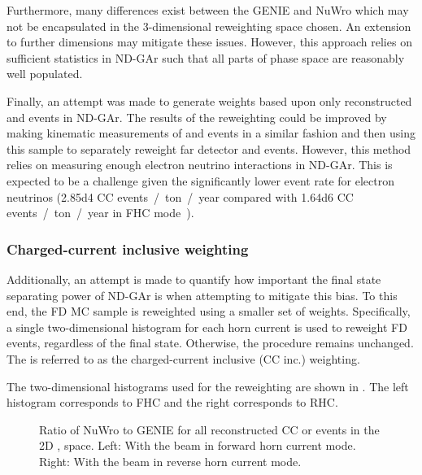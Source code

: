 Furthermore, many differences exist between the GENIE and NuWro which may not be encapsulated in the 3-dimensional reweighting space chosen.
An extension to further dimensions may mitigate these issues.
However, this approach relies on sufficient statistics in ND-GAr such that all parts of phase space are reasonably well populated.

Finally, an attempt was made to generate weights based upon only reconstructed \numu and \anumu events in ND-GAr.
The results of the reweighting could be improved by making kinematic measurements of \nue and \anue events in a similar fashion and then using this sample to separately reweight far detector \nue and \anue events.
However, this method relies on measuring enough electron neutrino interactions in ND-GAr.
This is expected to be a challenge given the significantly lower event rate for electron neutrinos (\num{2.85d4} CC events~/~ton~/~year compared with \num{1.64d6} \numu CC events~/~ton~/~year in FHC mode~\cite{ndCdr}).

\subsubsection{Charged-current inclusive weighting}

Additionally, an attempt is made to quantify how important the final state separating power of ND-GAr is when attempting to mitigate this bias.
To this end, the FD MC sample is reweighted using a smaller set of weights.
Specifically, a single two-dimensional histogram for each horn current is used to reweight FD events, regardless of the final state. 
Otherwise, the procedure remains unchanged.
The is referred to as the charged-current inclusive (CC inc.) weighting.

The two-dimensional histograms used for the reweighting are shown in . 
The left histogram corresponds to FHC and the right corresponds to RHC.

\begin{figure}[h]
	\begin{minipage}[t]{.5\linewidth}
		\begin{adjustbox}{max totalsize=\linewidth, center}
			
		\end{adjustbox}
	\end{minipage}
	\hfill
	\begin{minipage}[t]{.5\linewidth}
		\begin{adjustbox}{max totalsize=\linewidth, center}
			
		\end{adjustbox}
	\end{minipage}
	\caption[CC inclusive ratio of NuWro to GENIE in \evis and \pvis for FHC and RHC]{Ratio of NuWro to GENIE for all reconstructed CC \numu or \anumu events in the 2D \evis, \pvis space. Left: With the beam in forward horn current mode. Right: With the beam in reverse horn current mode.}
	\label{fig:ccIncWeightingHists}
\end{figure}

